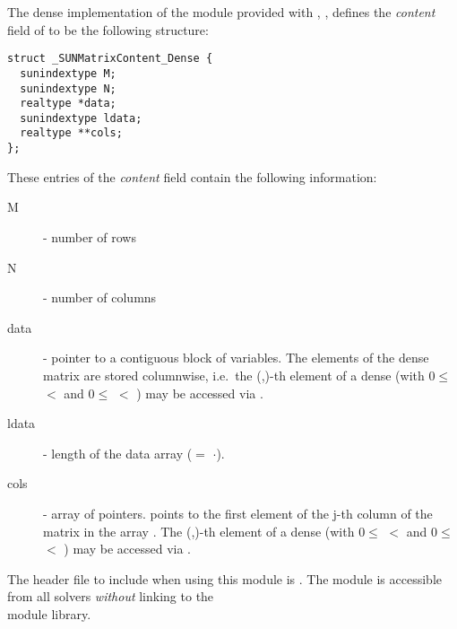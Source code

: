 
The dense implementation of the {\sunmatrix} module provided with
{\sundials}, {\sunmatdense}, defines the {\em content} field
of  to be the following structure:
\begin{verbatim} 
struct _SUNMatrixContent_Dense {
  sunindextype M;
  sunindextype N;
  realtype *data;
  sunindextype ldata;
  realtype **cols;
};
\end{verbatim}
These entries of the \emph{content} field contain the following
information:
\begin{description}
  \item[M] - number of rows
  \item[N] - number of columns
  \item[data] - pointer to a contiguous block of  variables.
    The elements of the dense matrix are stored columnwise, i.e.~the
    (,)-th element of a dense {\sunmatrix}  
    (with $0 \le$  $<$  and $ 0 \le$  $<$ ) 
    may be accessed via .
  \item[ldata] - length of the data array ($=$ $\cdot$).
  \item[cols] - array of pointers.  points to the first
    element of the j-th column of the matrix in the array .
    The (,)-th element of a dense {\sunmatrix} 
    (with $0 \le$  $<$  and $ 0 \le$  $<$ ) 
    may be accessed via .
\end{description}

\noindent The header file to include when using this module 
is . The {\sunmatdense} module
is accessible from all {\sundials} solvers \textit{without}
linking to the \\
 module library. \\

